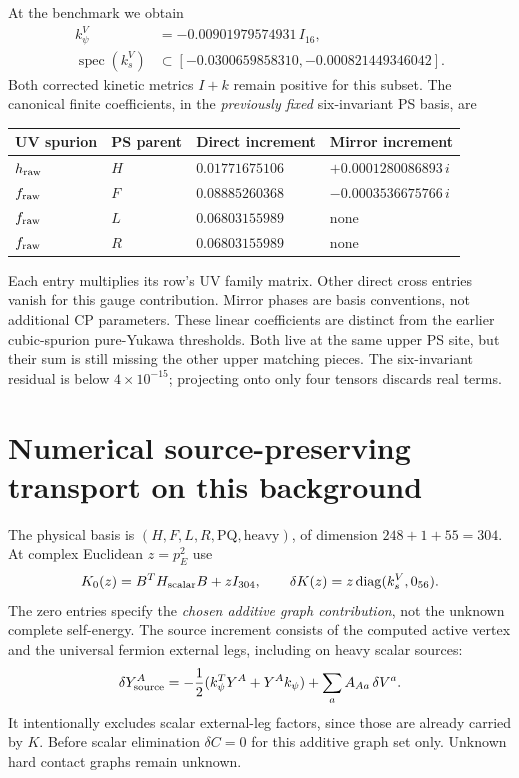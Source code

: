 \documentclass[11pt]{article}
\newcommand{\diag}{\operatorname{diag}}
\begin{document}
At the benchmark we obtain
\begin{align}
 k_\psi^V&=-0.00901979574931\,I_{16},\\
 \operatorname{spec}(k_s^V)&\subset
 [-0.0300659858310,-0.000821449346042].
\end{align}
Both corrected kinetic metrics $I+k$ remain positive for this subset.
The canonical finite coefficients, in the \emph{previously fixed}
six-invariant PS basis, are
\begin{center}
\begin{tabular}{llll}
\toprule
UV spurion & PS parent & Direct increment & Mirror increment\\
\midrule
$h_{\rm raw}$ & $H$ & $0.01771675106$ & $+0.0001280086893\,i$\\
$f_{\rm raw}$ & $F$ & $0.08885260368$ & $-0.0003536675766\,i$\\
$f_{\rm raw}$ & $L$ & $0.06803155989$ & none\\
$f_{\rm raw}$ & $R$ & $0.06803155989$ & none\\
\bottomrule
\end{tabular}
\end{center}
Each entry multiplies its row's UV family matrix. Other direct cross
entries vanish for this gauge contribution. Mirror phases are basis
conventions, not additional CP parameters. These linear coefficients
are distinct from the earlier cubic-spurion pure-Yukawa thresholds.
Both live at the same upper PS site, but their sum is still missing the
other upper matching pieces. The six-invariant residual is below
$4\times10^{-15}$; projecting onto only four tensors discards real terms.

\section{Numerical source-preserving transport on this background}
The physical basis is $(H,F,L,R,\mathrm{PQ},\mathrm{heavy})$, of dimension
$248+1+55=304$. At complex Euclidean $z=p_E^2$ use
\begin{equation}
 K_0(z)=B^TH_{\rm scalar}B+zI_{304},\qquad
 \delta K(z)=z\diag(k_s^V,0_{56}).
\end{equation}
The zero entries specify the \emph{chosen additive graph contribution},
not the unknown complete self-energy. The source increment consists of
the computed active vertex and the universal fermion external legs,
including on heavy scalar sources:
\begin{equation}
 \delta Y_{\rm source}^{A}=-\frac12(k_\psi^TY^A+Y^Ak_\psi)
                    +\sum_a A_{Aa}\,\delta V^a.
\end{equation}
It intentionally excludes scalar external-leg factors, since those are
already carried by $K$. Before scalar elimination $\delta C=0$ for
this additive graph set only. Unknown hard contact graphs remain unknown.
\end{document}
